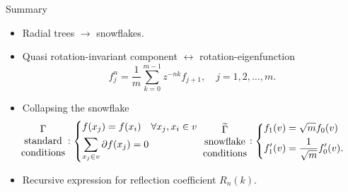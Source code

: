 \documentclass{beamer}
\begin{document}
  \begin{frame}{Summary}
    \begin{itemize}
      \item Radial trees $\to$ snowflakes.
      \pause
      \item Quasi rotation-invariant component $\leftrightarrow$ rotation-eigenfunction
      \[
        f^n_j = \frac{1}{m} \sum_{k=0}^{m-1} z^{-nk} f_{j+1}, \quad j=1,2,\ldots,m.
      \]
      \pause
      \vspace{-0.7em}
      \item Collapsing the snowflake
        \begin{align*}
          \!\!\!\!\!\!\!\!\!\!\!\!\!\!\begin{array}{c}
            \Gamma \\
            \text{standard} \\
            \text{conditions}
          \end{array}\!\!\!:
          \begin{dcases}
            f(x_j) = f(x_i) \quad \forall x_j, x_i \in v \\
            \sum_{x_j\in v}  \partial f(x_j) = 0
          \end{dcases}
          &&
          \!\!\!\!\!\!\begin{array}{c}
            \widetilde{\Gamma} \\
            \text{snowflake} \\
            \text{conditions}
          \end{array}\!\!\!:
          \begin{dcases}
            f_1(v) = \sqrt{m} f_0(v) \\
            f'_1(v) = \frac{1}{\sqrt{m}} f'_0(v).
          \end{dcases}
        \end{align*}
      \pause
      \item Recursive expression for reflection coefficient $R_n(k)$.
    \end{itemize}
  \end{frame}
\end{document}
